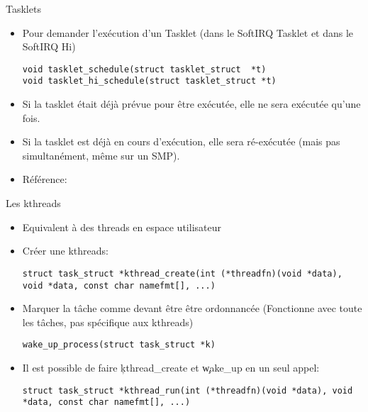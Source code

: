 \begin{frame}[fragile=singleslide]{Tasklets}
  \begin{itemize} 
  \item  Pour  demander  l'exécution  d'un Tasklet  (dans  le  SoftIRQ
    Tasklet et dans le SoftIRQ Hi)
    \begin{lstlisting} 
void tasklet_schedule(struct tasklet_struct  *t)
void tasklet_hi_schedule(struct tasklet_struct *t)
    \end{lstlisting} 
  \item Si  la tasklet était déjà  prévue pour être  exécutée, elle ne
    sera exécutée qu'une fois.
  \item  Si  la tasklet  est  déjà  en  cours d'exécution,  elle  sera
    ré-exécutée (mais pas simultanément, même sur un SMP).
  \item Référence: 
  \end{itemize}
\end{frame} 

\begin{frame}[fragile=singleslide]{Les kthreads}
  \begin{itemize}
  \item Equivalent à des threads en espace utilisateur
  \item Créer une kthreads:
    \begin{lstlisting} 
struct task_struct *kthread_create(int (*threadfn)(void *data), void *data, const char namefmt[], ...)
    \end{lstlisting} 
  \item  Marquer   la  tâche   comme  devant  être   être  ordonnancée
    (Fonctionne avec toute les tâches, pas spécifique aux kthreads)
    \begin{lstlisting} 
wake_up_process(struct task_struct *k)
    \end{lstlisting} 
  \item Il est possible de faire \c{kthread_create} et \c{wake_up} en
    un seul appel:
    \begin{lstlisting} 
struct task_struct *kthread_run(int (*threadfn)(void *data), void *data, const char namefmt[], ...)
    \end{lstlisting}
  \end{itemize}
\end{frame}

